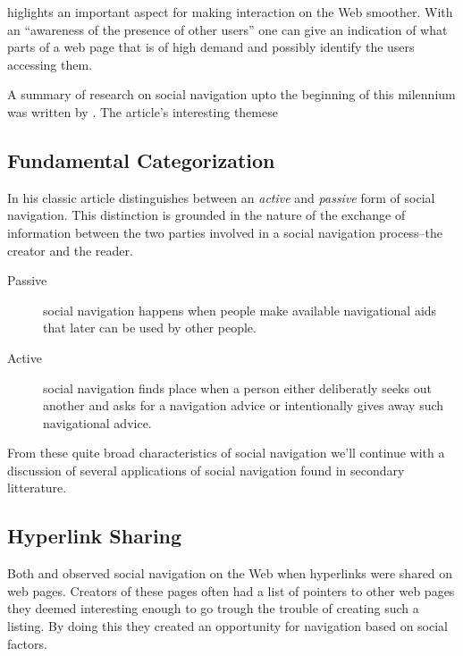 \citeauthor{dieberger97} higlights an important aspect for making interaction
on the Web smoother. With an ``awareness of the presence of
other users'' \citeyearpar[p.~812]{dieberger97} one can give an indication of
what parts of a web page that is of high demand and possibly identify the users
accessing them.

A summary of research on social navigation upto the beginning of this
milennium was written by \citet{dieberger00b}. The article's interesting
themese

\subsection{Fundamental Categorization}

In his classic article \citet{dieberger97} distinguishes between an
\emph{active} and \emph{passive} form of social navigation. This distinction
is grounded in the nature of the exchange of information between the two
parties involved in a social navigation process--the creator and the reader.

\begin{description}
  \item[Passive] social navigation happens when people make available
    navigational aids that later can be used by other people.
  \item[Active] social navigation finds place when a person either deliberatly
    seeks out another and asks for a navigation advice or intentionally gives
    away such navigational advice.
\end{description}

From these quite broad characteristics of social navigation we'll continue
with a discussion of several applications of social navigation found in
secondary litterature.

\subsection{Hyperlink Sharing}

Both \cite{dourish94} and \cite{dieberger97} observed social navigation on the
Web when hyperlinks were shared on web pages. Creators of these pages often
had a list of pointers to other web pages they deemed interesting enough to go
trough the trouble of creating such a listing. By doing this they created
an opportunity for navigation based on social factors.

